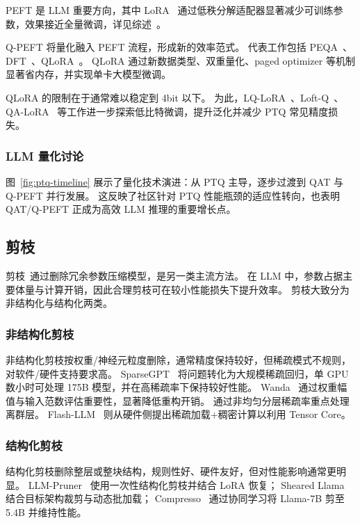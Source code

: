 PEFT 是 LLM 重要方向，其中 LoRA~\citep{hu2021lora,valipour2022dylora} 通过低秩分解适配器显著减少可训练参数，效果接近全量微调，详见综述~\citep{hu2023llm}。

Q-PEFT 将量化融入 PEFT 流程，形成新的效率范式。
代表工作包括 PEQA~\citep{kim2023memory}、DFT~\citep{li2023qft}、QLoRA~\citep{dettmers2023qlora}。
QLoRA 通过新数据类型、双重量化、paged optimizer 等机制显著省内存，并实现单卡大模型微调。

QLoRA 的限制在于通常难以稳定到 4bit 以下。
为此，LQ-LoRA~\citep{guo2023lq}、Loft-Q~\citep{li2023loftq}、QA-LoRA~\citep{xu2023qa} 等工作进一步探索低比特微调，提升泛化并减少 PTQ 常见精度损失。

\subsubsection{LLM 量化讨论}
图~\ref{fig:ptq-timeline} 展示了量化技术演进：从 PTQ 主导，逐步过渡到 QAT 与 Q-PEFT 并行发展。
这反映了社区针对 PTQ 性能瓶颈的适应性转向，也表明 QAT/Q-PEFT 正成为高效 LLM 推理的重要增长点。

\subsection{剪枝}

剪枝~\citep{lecun1989optimal,liang2021pruning}通过删除冗余参数压缩模型，是另一类主流方法。
在 LLM 中，参数占据主要体量与计算开销，因此合理剪枝可在较小性能损失下提升效率。
剪枝大致分为非结构化与结构化两类。

\subsubsection{非结构化剪枝}
非结构化剪枝按权重/神经元粒度删除，通常精度保持较好，但稀疏模式不规则，对软件/硬件支持要求高。
SparseGPT~\citep{frantar2023sparsegpt} 将问题转化为大规模稀疏回归，单 GPU 数小时可处理 175B 模型，并在高稀疏率下保持较好性能。
Wanda~\cite{sun2023simple} 通过权重幅值与输入范数评估重要性，显著降低重构开销。
\cite{yin2023outlier} 通过非均匀分层稀疏率重点处理离群层。
Flash-LLM~\citep{xia2023flash} 则从硬件侧提出稀疏加载+稠密计算以利用 Tensor Core。

\subsubsection{结构化剪枝}
结构化剪枝删除整层或整块结构，规则性好、硬件友好，但对性能影响通常更明显。
LLM-Pruner~\citep{ma2023llm} 使用一次性结构化剪枝并结合 LoRA 恢复；
Sheared Llama~\citep{xia2023sheared} 结合目标架构裁剪与动态批加载；
Compresso~\citep{guo2023compresso} 通过协同学习将 Llama-7B 剪至 5.4B 并维持性能。

